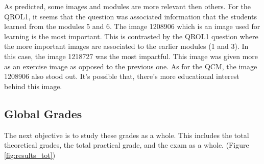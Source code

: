 \documentclass[a4paper,11pt]{report}
\numberwithin{figure}{section} %
\begin{document}
    As predicted, some images and modules are more relevant then others.
    For the QROL1, it seems that the question was associated information that the students learned from the modules 5 and 6.
    The image 1208906 which is an image used for learning is the most important.
    This is contrasted by the QROL1 question where the more important images are associated to the earlier modules (1 and 3).
    In this case, the image 1218727 was the most impactful.
    This image was given more as an exercise image as opposed to the previous one.
    As for the QCM, the image 1208906 also stood out.
    It's possible that, there's more educational interest behind this image.

    \subsection{Global Grades}

    The next objective is to study these grades as a whole.
    This includes the total theoretical grades, the total practical grade, and the exam as a whole. (Figure \ref{fig:results_tot})
\end{document}
